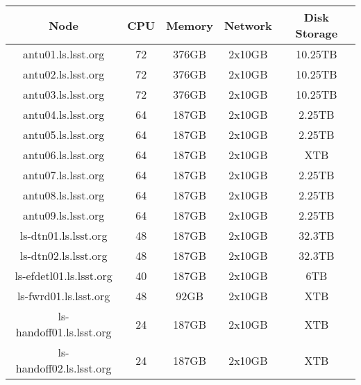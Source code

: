 \begin{center}
  \small
  \begin{tabular}{||c c c c c||}
    \hline
    \textbf{Node} & \textbf{CPU} & \textbf{Memory} & \textbf{Network} & \textbf{Disk Storage} \\ [0.5ex]
    \hline
    antu01.ls.lsst.org & 72 & 376GB & 2x10GB & 10.25TB \\
    \hline
    antu02.ls.lsst.org & 72 & 376GB & 2x10GB & 10.25TB \\
    \hline
    antu03.ls.lsst.org & 72 & 376GB & 2x10GB & 10.25TB \\
    \hline
    antu04.ls.lsst.org & 64 & 187GB & 2x10GB & 2.25TB \\
    \hline
    antu05.ls.lsst.org & 64 & 187GB & 2x10GB & 2.25TB \\
    \hline
    antu06.ls.lsst.org & 64 & 187GB & 2x10GB & XTB \\
    \hline
    antu07.ls.lsst.org & 64 & 187GB & 2x10GB & 2.25TB \\
    \hline
    antu08.ls.lsst.org & 64 & 187GB & 2x10GB & 2.25TB \\
    \hline
    antu09.ls.lsst.org & 64 & 187GB & 2x10GB & 2.25TB \\
    \hline
    ls-dtn01.ls.lsst.org & 48 & 187GB & 2x10GB & 32.3TB \\
    \hline
    ls-dtn02.ls.lsst.org & 48 & 187GB & 2x10GB & 32.3TB \\
    \hline
    ls-efdetl01.ls.lsst.org & 40 & 187GB & 2x10GB & 6TB \\
    \hline
    ls-fwrd01.ls.lsst.org & 48 & 92GB & 2x10GB & XTB \\
    \hline
    ls-handoff01.ls.lsst.org & 24 & 187GB & 2x10GB & XTB \\
    \hline
    ls-handoff02.ls.lsst.org & 24 & 187GB & 2x10GB & XTB \\
    \hline
  \end{tabular}
\end{center}

\newpage
